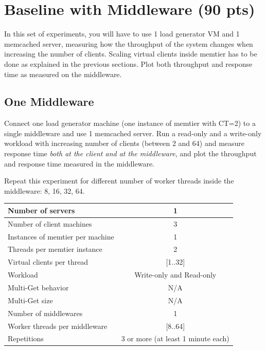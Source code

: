 \documentclass[11pt,a4paper]{article}
\begin{document}
\section{Baseline with Middleware (90 pts)}

In this set of experiments, you will have to use 1 load generator VM and 1 memcached server, measuring how the throughput of the system changes when increasing the number of clients. Scaling virtual clients inside memtier has to be done as explained in the previous sections. Plot both throughput and response time as measured on the middleware.

\subsection{One Middleware}

Connect one load generator machine (one instance of memtier with CT=2) to a single middleware and use 1 memcached server. Run a read-only and a write-only workload with increasing number of clients (between 2 and 64) and measure response time \emph{both at the client and at the middleware}, and plot the throughput and response time measured in the middleware.

Repeat this experiment for different number of worker threads inside the middleware: 8, 16, 32, 64.

\begin{center}
	\scriptsize{
		\begin{tabular}{|l|c|}
			\hline Number of servers                & 1                        \\ 
			\hline Number of client machines        & 3                        \\ 
			\hline Instances of memtier per machine & 1                        \\ 
			\hline Threads per memtier instance     & 2                        \\
			\hline Virtual clients per thread       & [1..32]                  \\ 
			\hline Workload                         & Write-only and Read-only \\
			\hline Multi-Get behavior               & N/A                      \\
			\hline Multi-Get size                   & N/A                      \\
			\hline Number of middlewares            & 1                        \\
			\hline Worker threads per middleware    & [8..64]                  \\
			\hline Repetitions                      & 3 or more (at least 1 minute each)                \\ 
			\hline 
		\end{tabular}
	} 
\end{center}
\end{document}
